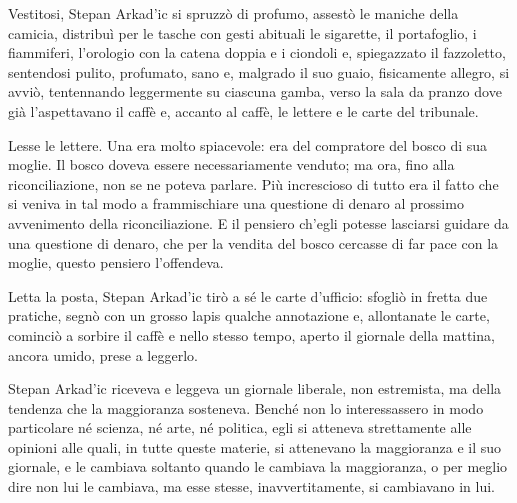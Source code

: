 \label{iii} 

Vestitosi, Stepan Arkad'ic si spruzzò di profumo, assestò le maniche della camicia, distribuì per le tasche con gesti abituali le sigarette, il portafoglio, i fiammiferi, l'orologio con la catena doppia e i ciondoli e, spiegazzato il fazzoletto, sentendosi pulito, profumato, sano e, malgrado il suo guaio, fisicamente allegro, si avviò, tentennando leggermente su ciascuna gamba, verso la sala da pranzo dove già l'aspettavano il caffè e, accanto al caffè, le lettere e le carte del tribunale. 

Lesse le lettere. Una era molto spiacevole: era del compratore del bosco di sua moglie. Il bosco doveva essere necessariamente venduto; ma ora, fino alla riconciliazione, non se ne poteva parlare. Più increscioso di tutto era il fatto che si veniva in tal modo a frammischiare una questione di denaro al prossimo avvenimento della riconciliazione. E il pensiero ch'egli potesse lasciarsi guidare da una questione di denaro, che per la vendita del bosco cercasse di far pace con la moglie, questo pensiero l'offendeva. 

Letta la posta, Stepan Arkad'ic tirò a sé le carte d'ufficio: sfogliò in fretta due pratiche, segnò con un grosso lapis qualche annotazione e, allontanate le carte, cominciò a sorbire il caffè e nello stesso tempo, aperto il giornale della mattina, ancora umido, prese a leggerlo. 

Stepan Arkad'ic riceveva e leggeva un giornale liberale, non estremista, ma della tendenza che la maggioranza sosteneva. Benché non lo interessassero in modo particolare né scienza, né arte, né politica, egli si atteneva strettamente alle opinioni alle quali, in tutte queste materie, si attenevano la maggioranza e il suo giornale, e le cambiava soltanto quando le cambiava la maggioranza, o per meglio dire non lui le cambiava, ma esse stesse, inavvertitamente, si cambiavano in lui. 

